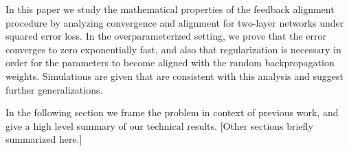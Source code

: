 In this paper we study the mathematical properties of the feedback alignment procedure by analyzing convergence and alignment for two-layer networks under squared error loss. In the overparameterized setting, we prove that the error converges to zero exponentially fast, and also that regularization is necessary in order for the  parameters to become aligned with the random backpropagation weights. Simulations are given that are consistent with this analysis and suggest further generalizations.

In the following section we frame the problem in context of previous work, and give
a high level summary of our technical results. [Other sections briefly summarized here.]
